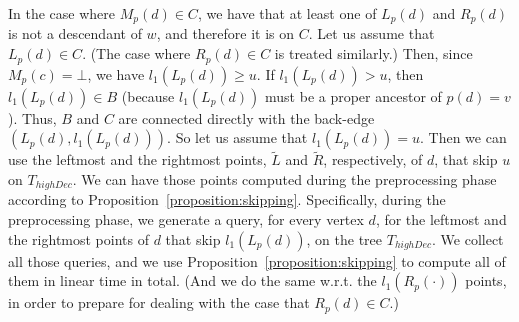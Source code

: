 \documentclass[11pt,a4paper]{article}
\begin{document}
In the case where $M_p(d)\in C$, we have that at least one of $L_p(d)$ and $R_p(d)$ is not a descendant of $w$, and therefore it is on $C$. Let us assume that $L_p(d)\in C$. (The case where $R_p(d)\in C$ is treated similarly.) Then, since $M_p(c)=\bot$, we have $l_1(L_p(d))\geq u$. If $l_1(L_p(d))>u$, then $l_1(L_p(d))\in B$ (because $l_1(L_p(d))$ must be a proper ancestor of $p(d)=v$). Thus, $B$ and $C$ are connected directly with the back-edge $(L_p(d),l_1(L_p(d)))$. So let us assume that $l_1(L_p(d))=u$. Then we can use the leftmost and the rightmost points, $\widetilde{L}$ and $\widetilde{R}$, respectively, of $d$, that skip $u$ on $T_\mathit{highDec}$. We can have those points computed during the preprocessing phase according to Proposition~\ref{proposition:skipping}. Specifically, during the preprocessing phase, we generate a query, for every vertex $d$, for the leftmost and the rightmost points of $d$ that skip $l_1(L_p(d))$, on the tree $T_\mathit{highDec}$. We collect all those queries, and we use Proposition~\ref{proposition:skipping} to compute all of them in linear time in total. (And we do the same w.r.t. the $l_1(R_p(\cdot))$ points, in order to prepare for dealing with the case that $R_p(d)\in C$.) 
\end{document}
